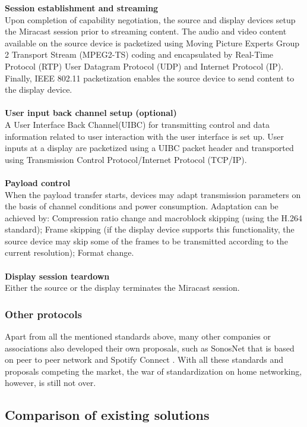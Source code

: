 \textbf{Session establishment and streaming} \\
Upon completion of capability negotiation, the source and display devices setup the Miracast session prior to streaming content. The audio and video content available on the source device is packetized 
using Moving Picture Experts Group 2 Transport Stream (MPEG2-TS) coding and encapsulated by Real-Time Protocol (RTP) User Datagram Protocol (UDP) and Internet Protocol (IP). Finally, IEEE 802.11 packetization enables the source device to send content to the display device. \\
\\
\textbf{User input back channel setup (optional)}\\
A User Interface Back Channel(UIBC) for transmitting control and data information related to user interaction with the user interface is set up. User inputs at a display are packetized using a UIBC packet header and transported using Transmission Control Protocol/Internet Protocol (TCP/IP).\\
\\
\textbf{Payload control}\\
When the payload transfer starts, devices may adapt transmission parameters on the basis of channel conditions and power     consumption. Adaptation can be achieved by: Compression ratio change and macroblock skipping (using the H.264 standard); Frame skipping (if the display device supports this functionality, the source device may skip some of the frames to be transmitted according to the current resolution); Format change. \\
\\ 
\textbf{Display session teardown} \\
Either the source or the display terminates the Miracast session.
\subsubsection{Other protocols}
Apart from all the mentioned standards above, many other companies or associations 
also developed their own proposals, such as SonosNet \cite{sonosnet} that is 
based on peer to peer network and Spotify Connect \cite{spotifyconnect}. With all these standards and proposals competing the market, the war of standardization on home networking, however, is still not over. 

\subsection{Comparison of existing solutions} 
